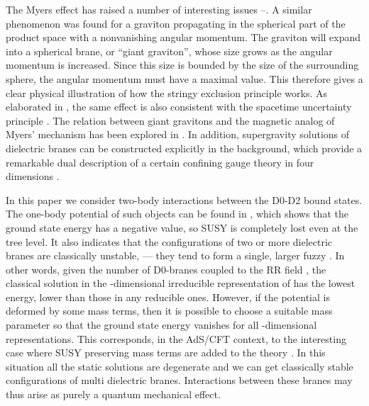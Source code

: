 \documentclass[a4paper,12pt]{article}
\begin{document}
The Myers effect has raised a number of interesting issues \cite{MST}--\cite{GR}. A similar phenomenon was found \cite{MST} for a graviton propagating in the spherical part of the product space \coordHE{} with a nonvanishing angular momentum. The graviton will expand into a spherical brane, or ``giant graviton'', whose size grows as the angular momentum is increased. Since this size is bounded by the size of the surrounding sphere, the angular momentum must have a maximal value. This therefore gives a clear physical illustration of how the stringy exclusion principle \cite{MS} works. As elaborated in \cite{Miao}, the same effect is also consistent with the spacetime uncertainty principle \cite{JYMY}. The relation between giant gravitons and the magnetic analog of Myers' mechanism has been explored in \cite{DTV}. In addition, supergravity solutions of dielectric branes can be constructed explicitly in the \coordHE{} background, which provide a remarkable dual description of a certain confining gauge theory in four dimensions \cite{PS}. 

In this paper we consider two-body interactions between the D0-D2 bound states. The one-body potential of such objects can be found in \cite{Myers}, which shows that the ground state energy has a negative value, so SUSY is completely lost even at the tree level. It also indicates that the configurations of two or more dielectric branes are classically unstable, --- they tend to form a single, larger fuzzy \coordHE{}. In other words, given the number \coordHE{} of D0-branes coupled to the RR field \coordHE{}, the classical solution in the \coordHE{}-dimensional irreducible representation of \coordHE{} has the lowest energy, lower than those in any reducible ones. However, if the potential is deformed by some mass terms, then it is possible to choose a suitable mass parameter so that the ground state energy vanishes for all \coordHE{}-dimensional representations. This corresponds, in the AdS/CFT context, to the interesting case where \coordHE{}  SUSY preserving mass terms are added to the \coordHE{} theory \cite{PS}. In this situation all the static solutions are degenerate and we can get classically stable configurations of multi dielectric branes. Interactions between these branes may thus arise as purely a quantum mechanical effect.
\end{document}
